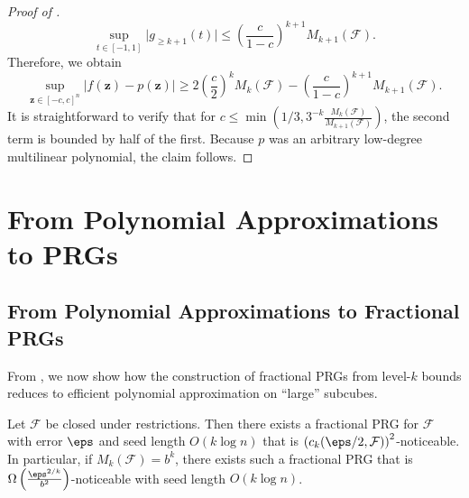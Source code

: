 \begin{proof}[Proof of ]
\begin{equation*}
    \sup_{t\in [-1,1]} \vert g_{\geq k+1}(t)\vert\leq \left(\frac{c}{1-c}\right)^{k+1}M_{k+1}(\mathcal{F}).
\end{equation*}
Therefore, we obtain
\begin{equation*}
    \sup_{\mathbf{z}\in [-c,c]^n} \vert f(\mathbf{z})-p(\mathbf{z})\vert\geq 2\left(\frac{c}{2}\right)^kM_k(\mathcal{F})-\left(\frac{c}{1-c}\right)^{k+1}M_{k+1}(\mathcal{F}).
\end{equation*}
It is straightforward to verify that for $c\leq \min\left(1/3, 3^{-k}  \frac{M_k(\mathcal{F})}{M_{k+1}(\mathcal{F})}\right)$, the second term is bounded by half of the first. Because $p$ was an arbitrary low-degree multilinear polynomial, the claim follows.
\end{proof}


    \section{From Polynomial Approximations to PRGs}
    \label{sec:patoprg}
\subsection{From Polynomial Approximations to Fractional PRGs}
From , we now show how the construction of fractional PRGs from level-$k$ bounds reduces to efficient polynomial approximation on ``large'' subcubes.
    \begin{THM}
    \label{thm:mkfprg}
        Let $\mathcal{F}$ be closed under restrictions. Then there exists a fractional PRG for $\mathcal{F}$ with error $\eps$ and seed length $O(k\log n)$ that is $\left(c_k(\eps/2,\mathcal{F})\right)^2$-noticeable. In particular, if $M_k(\mathcal{F})=b^k$, there exists such a fractional PRG that is $\Omega\left(\frac{\eps^{2/k}}{b^2}\right)$-noticeable with seed length $O(k\log n)$.
\end{THM}

